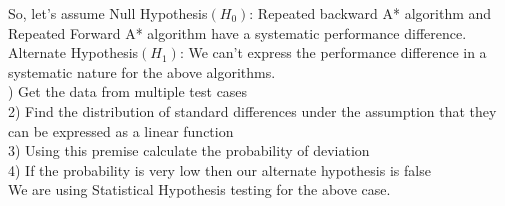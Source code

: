 \documentclass{article}
\begin{document}
\noindent So, let's assume
Null Hypothesis$(H_0)$:  Repeated backward A* algorithm and Repeated Forward A* algorithm have a systematic performance difference.\\
Alternate Hypothesis$(H_1)$: We can’t express the performance difference in a systematic nature for the above algorithms.\\

) Get the data from multiple test cases\\
2) Find the distribution of standard differences under the assumption that they can be expressed as a linear function\\
3) Using this premise calculate the probability of deviation\\
4) If the probability is very low then our alternate hypothesis is false\\

\noindent We are using Statistical Hypothesis testing for the above case.
\end{document}
